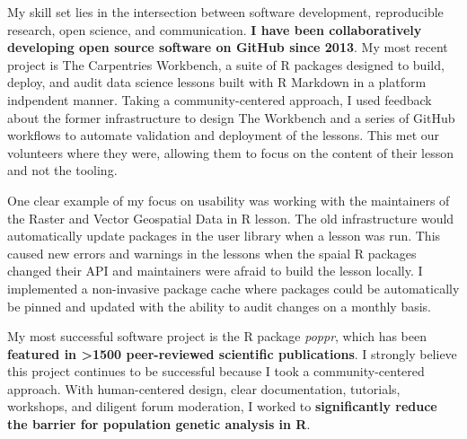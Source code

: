 

\vspace{1ex}


My skill set lies in the intersection between software development,
reproducible research, open science, and communication. 
\textbf{I have been collaboratively developing open source software on GitHub
since 2013}.
My most recent project is The Carpentries Workbench, a suite of R packages
designed to build, deploy, and audit data science lessons built with R Markdown
in a platform indpendent manner. Taking a community-centered approach, I used
feedback about the former infrastructure to design The Workbench and a series
of GitHub workflows to automate validation and deployment of the lessons.
This met our volunteers where they were, allowing them to focus on the content
of their lesson and not the tooling.

\vspace{1ex}

One clear example of my focus on usability was working with the maintainers of
the Raster and Vector Geospatial Data in R lesson. The old infrastructure would
automatically update packages in the user library when a lesson was run. This
caused new errors and warnings in the lessons when the spaial R packages changed
their API and maintainers were afraid to build the lesson locally. I implemented
a non-invasive package cache where packages could be automatically be pinned and
updated with the ability to audit changes on a monthly basis.


\vspace{1ex}

My most successful software project is the R package
\textit{poppr}, which has been \textbf{featured in \textgreater1500
peer-reviewed scientific publications}. I strongly believe this project 
continues to be successful because I took a community-centered approach. With
human-centered design, clear documentation, tutorials, workshops, and diligent
forum moderation, I worked to \textbf{significantly reduce the barrier
for population genetic analysis in R}.


\vspace{1ex}

%

